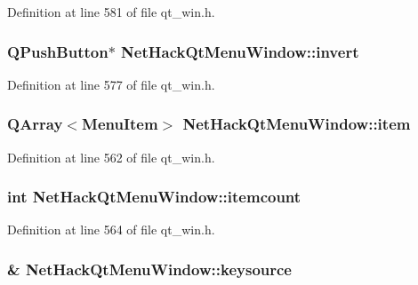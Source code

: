 Definition at line 581 of file qt\+\_\+win.\+h.

\hypertarget{classNetHackQtMenuWindow_aa1a2aa9149fcc0bb90814afe5fb1eefe}{
\subsubsection[{invert}]{\setlength{\rightskip}{0pt plus 5cm}Q\+Push\+Button$\ast$ Net\+Hack\+Qt\+Menu\+Window\+::invert\hspace{0.3cm}{\ttfamily [private]}}}\label{classNetHackQtMenuWindow_aa1a2aa9149fcc0bb90814afe5fb1eefe}


Definition at line 577 of file qt\+\_\+win.\+h.

\hypertarget{classNetHackQtMenuWindow_aaec42ac6f632112d34336815c8933075}{
\subsubsection[{item}]{\setlength{\rightskip}{0pt plus 5cm}Q\+Array$<${\bf Menu\+Item}$>$ Net\+Hack\+Qt\+Menu\+Window\+::item\hspace{0.3cm}{\ttfamily [private]}}}\label{classNetHackQtMenuWindow_aaec42ac6f632112d34336815c8933075}


Definition at line 562 of file qt\+\_\+win.\+h.

\hypertarget{classNetHackQtMenuWindow_a4a7d2fdb16df84bff23d2e3297dd9d75}{
\subsubsection[{itemcount}]{\setlength{\rightskip}{0pt plus 5cm}int Net\+Hack\+Qt\+Menu\+Window\+::itemcount\hspace{0.3cm}{\ttfamily [private]}}}\label{classNetHackQtMenuWindow_a4a7d2fdb16df84bff23d2e3297dd9d75}


Definition at line 564 of file qt\+\_\+win.\+h.

\hypertarget{classNetHackQtMenuWindow_a27e5b7a2172269810de78035bb0d7cc3}{
\subsubsection[{keysource}]{\& Net\+Hack\+Qt\+Menu\+Window\+::keysource\hspace{0.3cm}{\ttfamily [private]}}}\label{classNetHackQtMenuWindow_a27e5b7a2172269810de78035bb0d7cc3}


